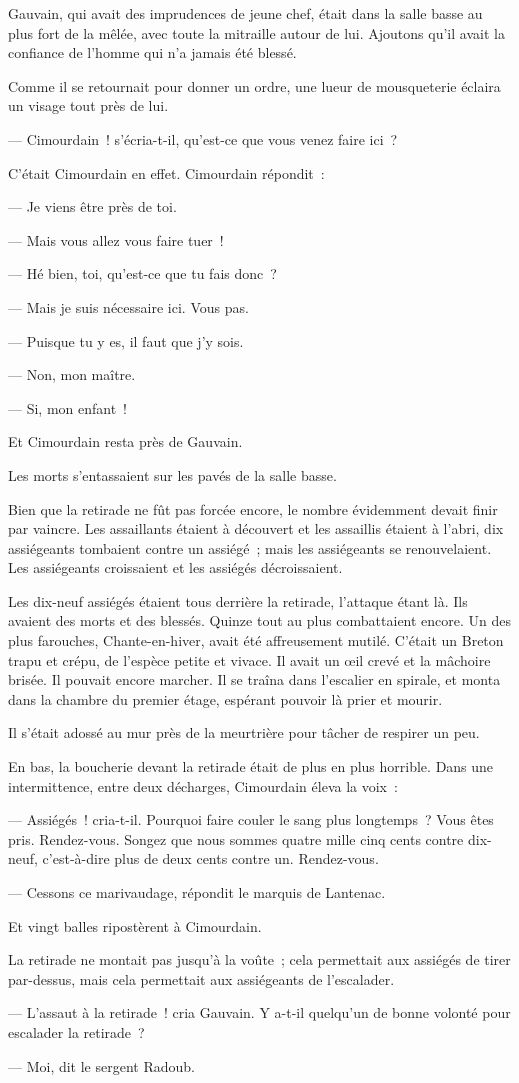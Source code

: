\documentclass[french,twoside]{book} %
\begin{document}
Gauvain, qui avait des imprudences de jeune chef, était dans la salle basse au plus fort de la mêlée, avec toute la mitraille autour de lui. Ajoutons qu’il avait la confiance de l’homme qui n’a jamais été blessé.\par
Comme il se retournait pour donner un ordre, une lueur de mousqueterie éclaira un visage tout près de lui.\par
— Cimourdain ! s’écria-t-il, qu’est-ce que vous venez faire ici ?\par
C’était Cimourdain en effet. Cimourdain répondit :\par
— Je viens être près de toi.\par
— Mais vous allez vous faire tuer !\par
— Hé bien, toi, qu’est-ce que tu fais donc ?\par
 — Mais je suis nécessaire ici. Vous pas.\par
— Puisque tu y es, il faut que j’y sois.\par
— Non, mon maître.\par
— Si, mon enfant !\par
Et Cimourdain resta près de Gauvain.\par
Les morts s’entassaient sur les pavés de la salle basse.\par
Bien que la retirade ne fût pas forcée encore, le nombre évidemment devait finir par vaincre. Les assaillants étaient à découvert et les assaillis étaient à l’abri, dix assiégeants tombaient contre un assiégé ; mais les assiégeants se renouvelaient. Les assiégeants croissaient et les assiégés décroissaient.\par
Les dix-neuf assiégés étaient tous derrière la retirade, l’attaque étant là. Ils avaient des morts et des blessés. Quinze tout au plus combattaient encore. Un des plus farouches, Chante-en-hiver, avait été affreusement mutilé. C’était un Breton trapu et crépu, de l’espèce petite et vivace. Il avait un œil crevé et la mâchoire brisée. Il pouvait encore marcher. Il se traîna dans l’escalier en spirale, et monta dans la chambre du premier étage, espérant pouvoir là prier et mourir.\par
Il s’était adossé au mur près de la meurtrière pour tâcher de respirer un peu.\par
En bas, la boucherie devant la retirade était de plus en plus horrible. Dans une intermittence, entre deux décharges, Cimourdain éleva la voix :\par
— Assiégés ! cria-t-il. Pourquoi faire couler le sang plus longtemps ? Vous êtes pris. Rendez-vous.  Songez que nous sommes quatre mille cinq cents contre dix-neuf, c’est-à-dire plus de deux cents contre un. Rendez-vous.\par
— Cessons ce marivaudage, répondit le marquis de Lantenac.\par
Et vingt balles ripostèrent à Cimourdain.\par
La retirade ne montait pas jusqu’à la voûte ; cela permettait aux assiégés de tirer par-dessus, mais cela permettait aux assiégeants de l’escalader.\par
— L’assaut à la retirade ! cria Gauvain. Y a-t-il quelqu’un de bonne volonté pour escalader la retirade ?\par
— Moi, dit le sergent Radoub.
\end{document}
